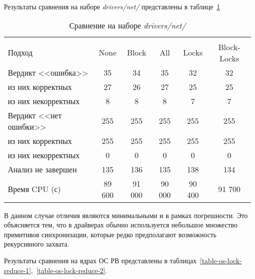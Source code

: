 Результаты сравнения на наборе \textit{drivers/net/} представлены в таблице~\ref{table-drivers-lock-reduce}

  \begin{table}[h]\footnotesize \centering
    \caption{Сравнение на наборе \textit{drivers/net/}}
  	\label{table-drivers-lock-reduce}
    \begin{tabular}{ | l | c | c | c | c | c |}
      \hline
      		& 		\multicolumn{5}{c|}{\combatmode}  \\
      Подход         				& None 	& Block 	& All 		& Locks 	& Block-Locks \\ \hline
      Вердикт <<ошибка>> 				& 35   	& 34       	& 35    	& 32       	& 32     \\ 
  \hspace{0.5cm} из них корректных 	& 27 	& 26 		& 27    	& 25       	& 25   \\ 
  \hspace{0.5cm} из них некорректных & 8 	& 8 		& 8     	& 7       	& 7    \\ \hline
      Вердикт <<нет ошибки>>  		& 255   & 255       & 255   	& 255       & 255     \\ 
  \hspace{0.5cm} из них корректных 	& 255 	& 255    	& 255   	& 255       & 255     \\
  \hspace{0.5cm} из них некорректных & 0 	& 0    		& 0     	& 0       	& 0  \\ \hline
      Анализ не завершен       		& 135    & 136      & 135    	& 138       & 134  \\ \hline
      Время CPU (с)   				& 89 600 & 91 000   & 90 000    & 90 400    & 91 700  \\ 
      \hline
    \end{tabular}
  \end{table}

В данном случае отличия являются минимальными и в рамках погрешности. 
Это объясняется тем, что в драйверах обычно используется небольшое множество примитивов синхронизации, которые редко предполагают возможность рекурсивного захвата.

Результаты сравнения на ядрах ОС РВ представлены в таблицах~\ref{table-os-lock-reduce-1},~\ref{table-os-lock-reduce-2}.

